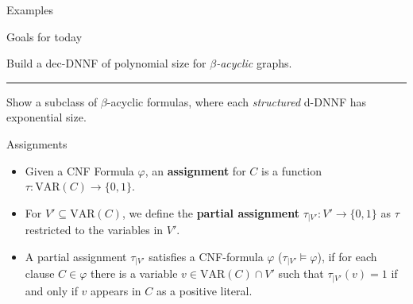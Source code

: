 \begin{frame}{Examples}
\end{frame}

\begin{frame}{Goals for today}
	\begin{minipage}[.3\textheight]{\textwidth}
		\centering
		Build a dec-DNNF of polynomial size for {\color{gray}\textit{$\beta$-acyclic} graphs}.
	\end{minipage}
	\vfill
	\hrule
	\vfill
	\begin{minipage}[.3\textheight]{\textwidth}
		\centering
		Show a subclass of $\beta$-acyclic formulas, where each {\color{gray}\textit{structured}} d-DNNF has exponential size.
	\end{minipage}
\end{frame}

\begin{frame}[t]{Assignments}
	\begin{itemize}[<+->]
		\item Given a CNF Formula $\varphi$, an \textbf{assignment} for $C$ is a function $\tau : \mathrm{VAR}(C) \rightarrow \{0, 1\}$.
		\item For $V' \subseteq \mathrm{VAR}(C)$, we define the \textbf{partial assignment} $\tau_{|V'} : V' \rightarrow \{0, 1\}$ as $\tau$ restricted to the variables in $V'$.
		\item A partial assignment $\tau_{|V'}$ satisfies a CNF-formula $\varphi$ ($\tau_{|V'} \models \varphi$), if for each clause $C \in \varphi$ there is a variable $v \in \mathrm{VAR}(C) \cap V'$ such that $\tau_{|V'}(v) = 1$ if and only if $v$ appears in $C$ as a positive literal.

	\end{itemize}
\end{frame}


